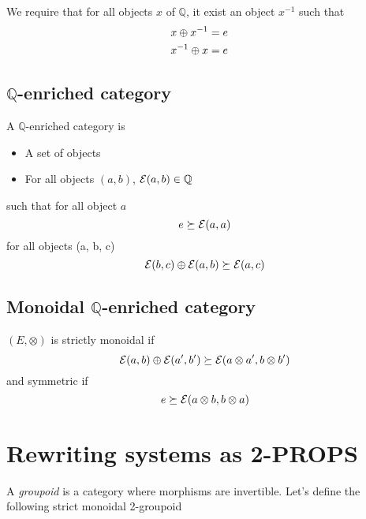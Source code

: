 \documentclass[a4paper]{article}
\begin{document}
We require that for all objects $x$ of $\mathbb{Q}$, it exist an object $x^{-1}$ such that
\begin{align}
x \oplus x^{-1} &= e \cr
x^{-1} \oplus x &= e
\end{align}

\subsection{$\mathbb{Q}$-enriched category}

A $\mathbb{Q}$-enriched category \catE is

\begin{itemize}
\item A set of objects
\item For all objects $(a, b)$, ${\cal E}(a, b) \in \mathbb{Q}$
\end{itemize}

such that for all object $a$
\[
e \succeq {\cal E}(a, a)
\]
for all objects (a, b, c)
\[
{\cal E}(b, c) \oplus {\cal E}(a, b) \succeq {\cal E}(a, c)
\]

\subsection{Monoidal $\mathbb{Q}$-enriched category}

$(E, \otimes)$ is strictly monoidal if
\[
{\cal E}(a, b) \oplus {\cal E}(a', b') \succeq {\cal E}(a \otimes a', b \otimes b')
\]
and symmetric if
\[
e \succeq {\cal E}(a \otimes b, b \otimes a)
\]

\section{Rewriting systems as 2-PROPS}
\label{sec:rewriting}

A \emph{groupoid} is a category where morphisms are invertible.
Let's define the following strict monoidal 2-groupoid \catC
\end{document}
